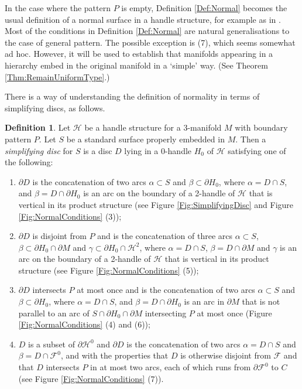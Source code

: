 \documentclass[oneside]{amsart}
\numberwithin{equation}{section}
\theoremstyle{plain}
\theoremstyle{definition}
\newtheorem{definition}[equation]{Definition}
\newcommand{\calH}{\mathcal{H}}
\newcommand{\calF}{\mathcal{F}}
\begin{document}
In the case where the pattern $P$ is empty, Definition \ref{Def:Normal} becomes the usual definition of a normal surface in
a handle structure, for example as in \cite[Definition 3.4.1]{Matveev}. Most of the conditions in Definition \ref{Def:Normal} are natural
generalisations to the case of general pattern. The possible exception is (7), which seems somewhat ad hoc. However,
it will be used to establish that manifolds appearing
in a hierarchy embed in the original manifold in a `simple' way. (See Theorem \ref{Thm:RemainUniformType}.)

There is a way of understanding the definition of normality in terms of simplifying discs, as follows.

\begin{definition}
Let $\calH$ be a handle structure for a 3-manifold $M$ with boundary pattern $P$. Let $S$ be a standard surface properly embedded in $M$. Then a \emph{simplifying disc} for $S$ is 
a disc $D$ lying in a 0-handle $H_0$ of $\calH$ satisfying one of the following:
\begin{enumerate}
\item $\partial D$ is the concatenation of two arcs $\alpha \subset S$ and $\beta \subset \partial H_0$, where $\alpha = D \cap S$, and $\beta = D \cap \partial H_0$ is an arc on the boundary of a 2-handle of $\calH$ that is vertical in its product structure (see Figure \ref{Fig:SimplifyingDisc} and Figure \ref{Fig:NormalConditions} (3));
\item $\partial D$ is disjoint from $P$ and is the concatenation of three arcs $\alpha \subset S$, $\beta \subset \partial H_0 \cap \partial M$ and $\gamma \subset \partial H_0 \cap \calH^2$, where $\alpha = D \cap S$, $\beta = D \cap \partial M$ and $\gamma$ is an arc on the boundary of a 2-handle of $\calH$ that is vertical in its product structure (see Figure \ref{Fig:NormalConditions} (5));
\item $\partial D$ intersects $P$ at most once and is the concatenation of two arcs $\alpha \subset S$ and $\beta \subset \partial H_0$, where $\alpha = D \cap S$, and $\beta = D \cap \partial H_0$ is an arc in $\partial M$ that is not parallel to an arc of $S \cap \partial H_0 \cap \partial M$ intersecting $P$ at most once (Figure \ref{Fig:NormalConditions} (4) and (6));
\item $D$ is a subset of $\partial \calH^0$ and $\partial D$ is the concatenation of two arcs $\alpha = D \cap S$ and $\beta = D \cap \calF^0$, and with the properties that $D$ is otherwise disjoint from $\calF$ and that $D$ intersects $P$ in at most two arcs, each of which runs from $\partial \mathcal{F}^0$ to $C$ (see Figure \ref{Fig:NormalConditions} (7)).
\end{enumerate}
\end{definition}
\end{document}
